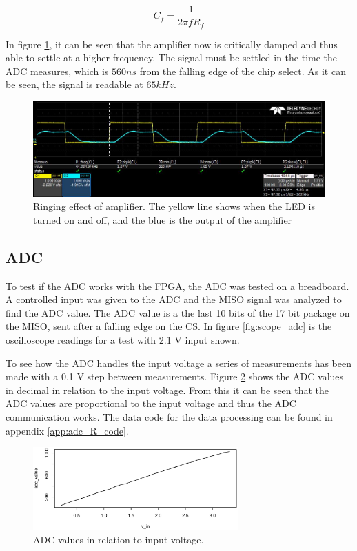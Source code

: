 \begin{equation}
 C_f = \frac{1}{2 \pi f R_f} \label{eq:capacitance_approximate}
\end{equation}

In figure \ref{fig::scope_op_amp_with_C}, it can be seen that the amplifier now is critically damped and thus able to settle at a higher frequency.
The signal must be settled in the time the ADC measures, which is $560 ns$ from the falling edge of the chip select.
As it can be seen, the signal is readable at $65 kHz$.


\begin{figure}[h]
\includegraphics[width=0.9\linewidth]{img/ringing_test_filtered_rise.jpg}
\caption{Ringing effect of amplifier. The yellow line shows when the LED is turned on and off, and the blue is the output of the amplifier}
\label{fig::scope_op_amp_with_C}
\end{figure}

\subsection{ADC}
To test if the ADC works with the FPGA, the ADC was tested on a breadboard.
A controlled input was given to the ADC and the MISO signal was analyzed to find the ADC value.
The ADC value is a the last 10 bits of the 17 bit package on the MISO, sent after a falling edge on the CS.
In figure \ref{fig:scope_adc} is the oscilloscope readings for a test with 2.1 V input shown.

To see how the ADC handles the input voltage a series of measurements has been made with a 0.1 V step between measurements.
Figure \ref{fig:adc_values} shows the ADC values in decimal in relation to the input voltage.
From this it can be seen that the ADC values are proportional to the input voltage and thus the ADC communication works.
The data code for the data processing can be found in appendix \ref{app:adc_R_code}.

\begin{figure}[ht]
 \centering
 \includegraphics[width=0.7\textwidth]{img/ADC_values}
 \caption{ADC values in relation to input voltage.}
 \label{fig:adc_values}
\end{figure}

